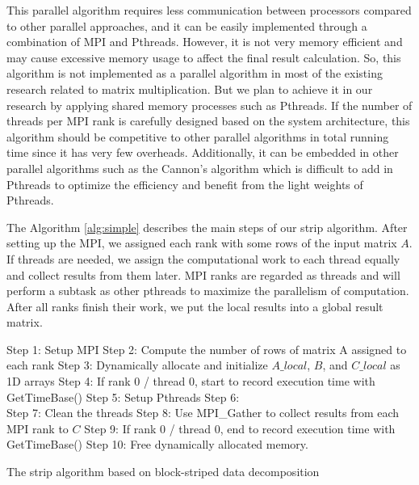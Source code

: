 \documentclass[conference]{IEEEtran}
\begin{document}
This parallel algorithm requires less communication between processors compared to other parallel approaches, and it can be easily implemented through a combination of MPI and Pthreads. However, it is not very memory efficient and may cause excessive memory usage to affect the final result calculation. So, this algorithm is not implemented as a parallel algorithm in most of the existing research related to matrix multiplication. But we plan to achieve it in our research by applying shared memory processes such as Pthreads. If the number of threads per MPI rank is carefully designed based on the system architecture, this algorithm should be competitive to other parallel algorithms in total running time since it has very few overheads. Additionally, it can be embedded in other parallel algorithms such as the Cannon's algorithm which is difficult to add in Pthreads to optimize the efficiency and benefit from the light weights of Pthreads.

The Algorithm \ref{alg:simple} describes the main steps of our strip algorithm. After setting up the MPI, we assigned each rank with some rows of the input matrix $A$. If threads are needed, we assign the computational work to each thread equally and collect results from them later. MPI ranks are regarded as threads and will perform a subtask as other pthreads to maximize the parallelism of computation. After all ranks finish their work, we put the local results into a global result matrix.

\begin{algorithm}[H]
\SetAlgoLined
{}
 \Begin
  {Step 1: Setup MPI\;
   Step 2: Compute the number of rows of matrix A assigned to each rank\;
   Step 3: Dynamically allocate and initialize $A\_local$, $B$, and $C\_local$ as 1D arrays\;
   Step 4: If rank 0 / thread 0, start to record execution time with GetTimeBase()\;
   Step 5: Setup Pthreads\; 
   Step 6:\\
    Step 7: Clean the threads\;
    Step 8: Use MPI\_Gather to collect results from each MPI rank to $C$\;
    Step 9: If rank 0 / thread 0, end to record execution time with GetTimeBase()\;
    Step 10: Free dynamically allocated memory.
  }
 \End
 \caption{The strip algorithm based on block-striped data decomposition}
 \label{alg:simple}
\end{algorithm}
\end{document}
